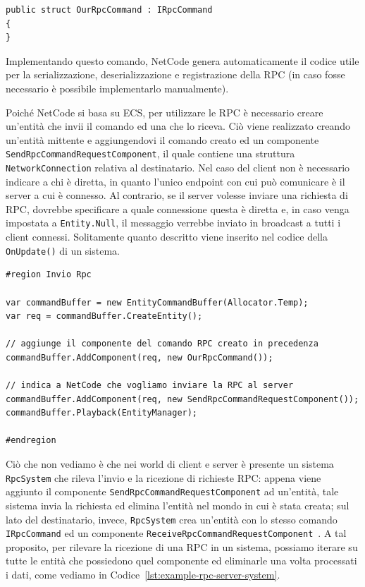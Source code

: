 \begin{lstlisting}[caption={Esempio di comando RPC non contenente campi.}, label={lst:example-rpc-struct},language={[Sharp]C}]
public struct OurRpcCommand : IRpcCommand
{
}
\end{lstlisting}

Implementando questo comando, NetCode genera automaticamente il codice utile per la serializzazione, deserializzazione e registrazione della RPC (in caso fosse necessario è possibile implementarlo manualmente).

Poiché NetCode si basa su ECS, per utilizzare le RPC è necessario creare un'entità che invii il comando ed una che lo riceva. Ciò viene realizzato creando un'entità mittente e aggiungendovi il comando creato ed un componente \verb|SendRpcCommandRequestComponent|, il quale contiene una struttura \verb|NetworkConnection| relativa al destinatario. Nel caso del client non è necessario indicare a chi è diretta, in quanto l'unico endpoint con cui può comunicare è il server a cui è connesso. Al contrario, se il server volesse inviare una richiesta di RPC, dovrebbe specificare a quale connessione questa è diretta e, in caso venga impostata a \verb|Entity.Null|, il messaggio verrebbe inviato in broadcast a tutti i client connessi. Solitamente quanto descritto viene inserito nel codice della \verb|OnUpdate()| di un sistema.

\begin{lstlisting}[caption={Esempio di invio di un comando Rpc dal client.}, label={lst:example-rpc-client-system},language={[Sharp]C}]
#region Invio Rpc

var commandBuffer = new EntityCommandBuffer(Allocator.Temp);
var req = commandBuffer.CreateEntity();

// aggiunge il componente del comando RPC creato in precedenza
commandBuffer.AddComponent(req, new OurRpcCommand());

// indica a NetCode che vogliamo inviare la RPC al server
commandBuffer.AddComponent(req, new SendRpcCommandRequestComponent());
commandBuffer.Playback(EntityManager);

#endregion
\end{lstlisting}

Ciò che non vediamo è che nei world di client e server è presente un sistema \verb|RpcSystem| che rileva l'invio e la ricezione di richieste RPC: appena viene aggiunto il componente \verb|SendRpcCommandRequestComponent| ad un'entità, tale sistema invia la richiesta ed elimina l'entità nel mondo in cui è stata creata; sul lato del destinatario, invece, \verb|RpcSystem| crea un'entità con lo stesso comando \verb|IRpcCommand| ed un componente \verb|ReceiveRpcCommandRequestComponent|~\cite{doc:unity-netcode-manual}. A tal proposito, per rilevare la ricezione di una RPC in un sistema, possiamo iterare su tutte le entità che possiedono quel componente ed eliminarle una volta processati i dati, come vediamo in Codice~\ref{lst:example-rpc-server-system}.

